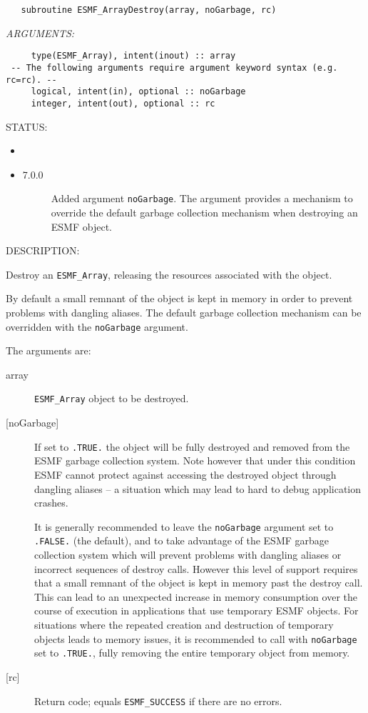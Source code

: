 \begin{verbatim}   subroutine ESMF_ArrayDestroy(array, noGarbage, rc)\end{verbatim}{\em ARGUMENTS:}
\begin{verbatim}     type(ESMF_Array), intent(inout) :: array
 -- The following arguments require argument keyword syntax (e.g. rc=rc). --
     logical, intent(in), optional :: noGarbage
     integer, intent(out), optional :: rc\end{verbatim}
{\sf STATUS:}
   \begin{itemize}
   \item{}
   \item{}
   \begin{description}
   \item[7.0.0] Added argument {\tt noGarbage}.
   The argument provides a mechanism to override the default garbage collection
   mechanism when destroying an ESMF object.
   \end{description}
   \end{itemize}
  
{\sf DESCRIPTION:\\ }


   Destroy an {\tt ESMF\_Array}, releasing the resources associated with
   the object.
  
   By default a small remnant of the object is kept in memory in order to
   prevent problems with dangling aliases. The default garbage collection
   mechanism can be overridden with the {\tt noGarbage} argument.
  
   The arguments are:
   \begin{description}
   \item[array]
   {\tt ESMF\_Array} object to be destroyed.
   \item[{[noGarbage]}]
   If set to {\tt .TRUE.} the object will be fully destroyed and removed
   from the ESMF garbage collection system. Note however that under this
   condition ESMF cannot protect against accessing the destroyed object
   through dangling aliases -- a situation which may lead to hard to debug
   application crashes.
  
   It is generally recommended to leave the {\tt noGarbage} argument
   set to {\tt .FALSE.} (the default), and to take advantage of the ESMF
   garbage collection system which will prevent problems with dangling
   aliases or incorrect sequences of destroy calls. However this level of
   support requires that a small remnant of the object is kept in memory
   past the destroy call. This can lead to an unexpected increase in memory
   consumption over the course of execution in applications that use
   temporary ESMF objects. For situations where the repeated creation and
   destruction of temporary objects leads to memory issues, it is
   recommended to call with {\tt noGarbage} set to {\tt .TRUE.}, fully
   removing the entire temporary object from memory.
   \item[{[rc]}]
   Return code; equals {\tt ESMF\_SUCCESS} if there are no errors.
   \end{description}
  
\setlength{\parskip}{\oldparskip}
\setlength{\parindent}{\oldparindent}
\setlength{\baselineskip}{\oldbaselineskip}
